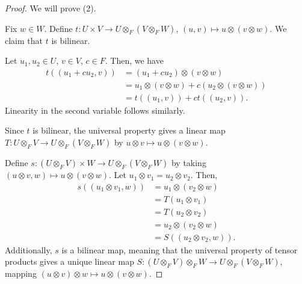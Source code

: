 \documentclass[10pt]{mypackage}
\begin{document}
  \begin{proof}
    We will prove (2).\newline

    Fix $w\in W$. Define $t: U\times V \rightarrow U\otimes_{F}\left(V\otimes_{F} W\right)$, $\left(u,v\right)\mapsto u\otimes\left(v\otimes w\right)$. We claim that $t$ is bilinear.\newline

    Let $u_1,u_2\in U$, $v\in V$, $c\in F$. Then, we have
    \begin{align*}
      t\left(\left(u_1 + cu_2,v\right)\right) &= \left(u_1 + cu_2\right)\otimes \left(v\otimes w\right)\\
                                              &= u_1\otimes \left(v\otimes w\right) + c\left(u_2\otimes \left(v\otimes w\right)\right)\\
                                              &= t\left(\left(u_1,v\right)\right) + ct\left(\left(u_2,v\right)\right).
    \end{align*}
    Linearity in the second variable follows similarly.\newline

    Since $t$ is bilinear, the universal property gives a linear map $T: U\otimes_{F} V\rightarrow U\otimes_{F}\left(V\otimes_{F}W\right)$ by $u\otimes v \mapsto u\otimes \left(v\otimes w\right)$.\newline

    Define $s: \left(U\otimes_{F} V\right)\times W \rightarrow U\otimes_{F}\left(V\otimes_{F}W\right)$ by taking $\left(u\otimes v,w\right)\mapsto u\otimes \left(v\otimes w\right)$. Let $u_1 \otimes v_1 = u_2\otimes v_2$. Then,
    \begin{align*}
      s\left(\left(u_1\otimes v_1,w\right)\right) &= u_1\otimes \left(v_2\otimes w\right)\\
                                                  &= T\left(u_1\otimes v_1\right)\\
                                                  &= T\left(u_2\otimes v_2\right)\\
                                                  &= u_2\otimes \left(v_2\otimes w\right)\\
                                                  &= S\left(\left(u_2\otimes v_2,w\right)\right).
    \end{align*}
    Additionally, $s$ is a bilinear map, meaning that the universal property of tensor products gives a unique linear map $S: \left(U\otimes_{F}V\right)\otimes_{F}W \rightarrow U\otimes_{F}\left(V\otimes_{F}W\right)$, mapping $\left(u\otimes v\right)\otimes w \mapsto u\otimes \left(v\otimes w\right)$.\newline


\end{proof}
\end{document}
